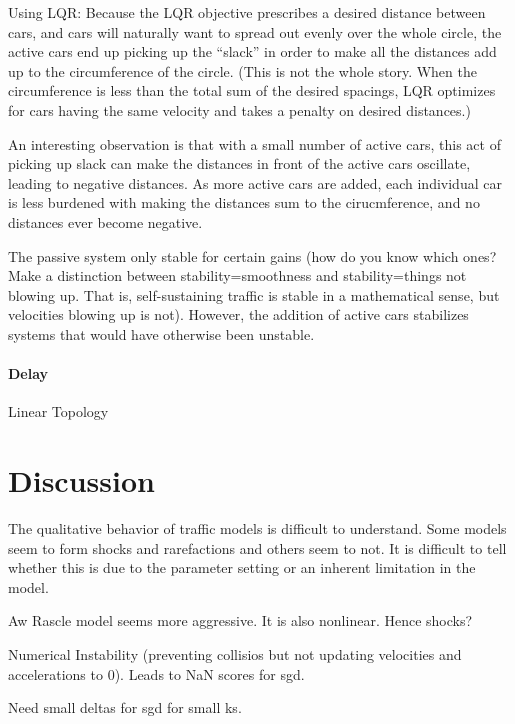 \documentclass[11pt]{article}
\begin{document}
\begin{multicols}{2}
Using LQR: Because the LQR objective prescribes a desired distance between cars, and cars will naturally want to spread out evenly over the whole circle, the active cars end up picking up the ``slack'' in order to make all the distances add up to the circumference of the circle. (This is not the whole story. When the circumference is less than the total sum of the desired spacings, LQR optimizes for cars having the same velocity and takes a penalty on desired distances.)

An interesting observation is that with a small number of active cars, this act of picking up slack can make the distances in front of the active cars oscillate, leading to negative distances. As more active cars are added, each individual car is less burdened with making the distances sum to the cirucmference, and no distances ever become negative.

The passive system only stable for certain gains (how do you know which ones? Make a distinction between stability=smoothness and stability=things not blowing up. That is, self-sustaining traffic is stable in a mathematical sense, but velocities blowing up is not). However, the addition of active cars stabilizes systems that would have otherwise been unstable.

\paragraph{Delay}




Linear Topology


\section{Discussion}  

The qualitative behavior of traffic models is difficult to understand. Some models seem to form shocks and rarefactions and others seem to not. It is difficult to tell whether this is due to the parameter setting or an inherent limitation in the model.

Aw Rascle model seems more aggressive. It is also nonlinear. Hence shocks?

Numerical Instability (preventing collisios but not updating velocities and accelerations to 0). Leads to NaN scores for sgd.

Need small deltas for sgd for small ks.


\end{multicols}
\end{document}
